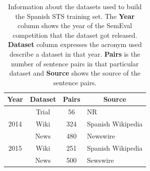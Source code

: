 \begin{enumerate}
\begin{table}[ht!]
	\centering
	\begin{tabular}{c|c|c|l}
		\hline
		\multicolumn{1}{c|}{\textbf{Year}} & 
		\multicolumn{1}{c|}{\textbf{Dataset}} & 
		\multicolumn{1}{c|}{\textbf{Pairs}} & 
		\multicolumn{1}{c}{\textbf{Source}} \\
		\hline
		 & Trial & 56 & NR \\
		2014 \cite{agirre-etal-2014-semeval} & Wiki  & 324 & Spanish Wikipedia \\
		 & News  & 480 & Newswire \\
		\hline
		2015 \cite{agirre-etal-2014-semeval} & Wiki & 251 & Spanish Wikipedia \\
		 & News & 500 & Sewswire \\
		\hline
	\end{tabular}
	\caption[Information about Spanish STS training set]{Information about the datasets used to build the Spanish STS training set. The \textbf{Year} column shows the year of the SemEval competition that the dataset got released. \textbf{Dataset} column expresses the acronym used describe a dataset in that year. \textbf{Pairs} is the number of sentence pairs in that particular dataset and \textbf{Source} shows the source of the sentence pairs. }
	\label{tab:spanishdata_info}
\end{table}



\end{enumerate}
